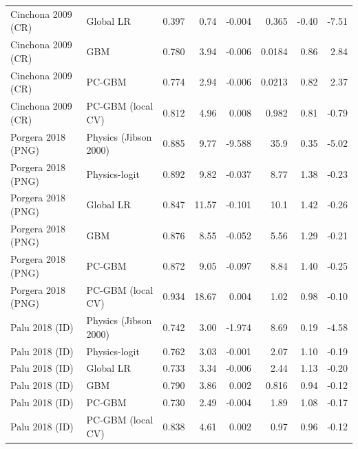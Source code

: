 \begin{longtable}{llrrrrrr}
Cinchona 2009 (CR) & Global LR & 0.397 & 0.74 & -0.004 & 0.365 & -0.40 & -7.51\\
Cinchona 2009 (CR) & GBM & 0.780 & 3.94 & -0.006 & 0.0184 & 0.86 & 2.84\\
Cinchona 2009 (CR) & PC-GBM & 0.774 & 2.94 & -0.006 & 0.0213 & 0.82 & 2.37\\
Cinchona 2009 (CR) & PC-GBM (local CV) & 0.812 & 4.96 & 0.008 & 0.982 & 0.81 & -0.79\\
\midrule
Porgera 2018 (PNG) & Physics (Jibson 2000) & 0.885 & 9.77 & -9.588 & 35.9 & 0.35 & -5.02\\
Porgera 2018 (PNG) & Physics-logit & 0.892 & 9.82 & -0.037 & 8.77 & 1.38 & -0.23\\
Porgera 2018 (PNG) & Global LR & 0.847 & 11.57 & -0.101 & 10.1 & 1.42 & -0.26\\
Porgera 2018 (PNG) & GBM & 0.876 & 8.55 & -0.052 & 5.56 & 1.29 & -0.21\\
Porgera 2018 (PNG) & PC-GBM & 0.872 & 9.05 & -0.097 & 8.84 & 1.40 & -0.25\\
Porgera 2018 (PNG) & PC-GBM (local CV) & 0.934 & 18.67 & 0.004 & 1.02 & 0.98 & -0.10\\
\midrule
Palu 2018 (ID) & Physics (Jibson 2000) & 0.742 & 3.00 & -1.974 & 8.69 & 0.19 & -4.58\\
Palu 2018 (ID) & Physics-logit & 0.762 & 3.03 & -0.001 & 2.07 & 1.10 & -0.19\\
Palu 2018 (ID) & Global LR & 0.733 & 3.34 & -0.006 & 2.44 & 1.13 & -0.20\\
Palu 2018 (ID) & GBM & 0.790 & 3.86 & 0.002 & 0.816 & 0.94 & -0.12\\
Palu 2018 (ID) & PC-GBM & 0.730 & 2.49 & -0.004 & 1.89 & 1.08 & -0.17\\
Palu 2018 (ID) & PC-GBM (local CV) & 0.838 & 4.61 & 0.002 & 0.97 & 0.96 & -0.12\\
\bottomrule
\end{longtable}
